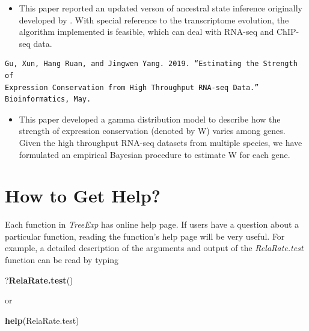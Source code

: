 \documentclass[]{book}
\newenvironment{Shaded}{\begin{snugshade}}{\end{snugshade}}
\newcommand{\KeywordTok}[1]{\textcolor[rgb]{0.13,0.29,0.53}{\textbf{#1}}}
\newcommand{\NormalTok}[1]{#1}
\providecommand{\tightlist}{%
  \setlength{\itemsep}{0pt}\setlength{\parskip}{0pt}}
\begin{document}
\begin{itemize}
\tightlist
\item
  This paper\citep{YANG2018} reported an updated verson of ancestral state inference originally developed by \citep{gu2004}. With special reference to the transcriptome evolution, the algorithm implemented is feasible, which can deal with RNA-seq and ChIP-seq data.
\end{itemize}

\begin{verbatim}
Gu, Xun, Hang Ruan, and Jingwen Yang. 2019. “Estimating the Strength of 
Expression Conservation from High Throughput RNA-seq Data.” Bioinformatics, May.
\end{verbatim}

\begin{itemize}
\tightlist
\item
  This paper \citep{10.1093/bioinformatics/btz405} developed a gamma distribution model to describe how the strength of expression conservation (denoted by W) varies among genes. Given the high throughput RNA-seq datasets from multiple species, we have formulated an empirical Bayesian procedure to estimate W for each gene.
\end{itemize}

\newpage

\hypertarget{how-to-get-help}{%
\section{How to Get Help?}\label{how-to-get-help}}

Each function in \emph{TreeExp} has online help page. If users have a question about a particular function, reading the function's help page will be very useful. For example, a detailed description of the arguments and output of the \emph{RelaRate.test} function can be read by typing

\begin{Shaded}
\begin{Highlighting}[]
\NormalTok{?}\KeywordTok{RelaRate.test}\NormalTok{()}
\end{Highlighting}
\end{Shaded}

or

\begin{Shaded}
\begin{Highlighting}[]
\KeywordTok{help}\NormalTok{(RelaRate.test)}
\end{Highlighting}
\end{Shaded}
\end{document}
